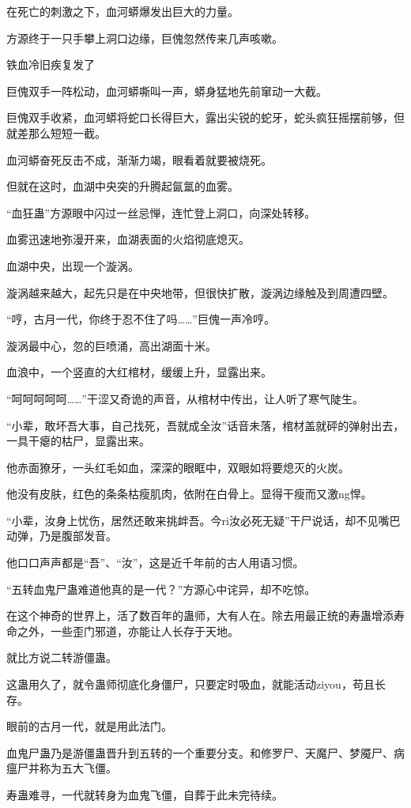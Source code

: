 \begin{this_body}
在死亡的刺激之下，血河蟒爆发出巨大的力量。

方源终于一只手攀上洞口边缘，巨傀忽然传来几声咳嗽。

铁血冷旧疾复发了

巨傀双手一阵松动，血河蟒嘶叫一声，蟒身猛地先前窜动一大截。

巨傀双手收紧，血河蟒将蛇口长得巨大，露出尖锐的蛇牙，蛇头疯狂摇摆前够，但就差那么短短一截。

血河蟒奋死反击不成，渐渐力竭，眼看着就要被烧死。

但就在这时，血湖中央突的升腾起氤氲的血雾。

“血狂蛊”方源眼中闪过一丝忌惮，连忙登上洞口，向深处转移。

血雾迅速地弥漫开来，血湖表面的火焰彻底熄灭。

血湖中央，出现一个漩涡。

漩涡越来越大，起先只是在中央地带，但很快扩散，漩涡边缘触及到周遭四壁。

“哼，古月一代，你终于忍不住了吗……”巨傀一声冷哼。

漩涡最中心，忽的巨喷涌，高出湖面十米。

血浪中，一个竖直的大红棺材，缓缓上升，显露出来。

“呵呵呵呵呵……”干涩又奇诡的声音，从棺材中传出，让人听了寒气陡生。

“小辈，敢坏吾大事，自己找死，吾就成全汝”话音未落，棺材盖就砰的弹射出去，一具干瘪的枯尸，显露出来。

他赤面獠牙，一头红毛如血，深深的眼眶中，双眼如将要熄灭的火炭。

他没有皮肤，红色的条条枯瘦肌肉，依附在白骨上。显得干瘦而又激ng悍。

“小辈，汝身上忧伤，居然还敢来挑衅吾。今ri汝必死无疑”干尸说话，却不见嘴巴动弹，乃是腹部发音。

他口口声声都是“吾”、“汝”，这是近千年前的古人用语习惯。

“五转血鬼尸蛊难道他真的是一代？”方源心中诧异，却不吃惊。

在这个神奇的世界上，活了数百年的蛊师，大有人在。除去用最正统的寿蛊增添寿命之外，一些歪门邪道，亦能让人长存于天地。

就比方说二转游僵蛊。

这蛊用久了，就令蛊师彻底化身僵尸，只要定时吸血，就能活动ziyou，苟且长存。

眼前的古月一代，就是用此法门。

血鬼尸蛊乃是游僵蛊晋升到五转的一个重要分支。和修罗尸、天魔尸、梦魇尸、病瘟尸并称为五大飞僵。

寿蛊难寻，一代就转身为血鬼飞僵，自葬于此未完待续。

\end{this_body}

